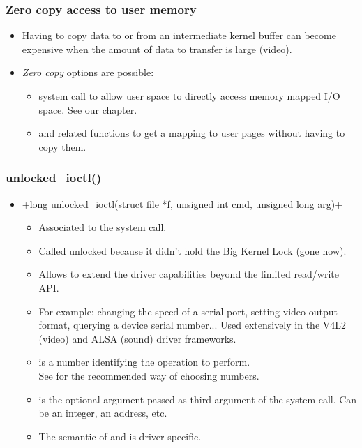 \begin{frame}
  \frametitle{Zero copy access to user memory}
  \begin{itemize}
  \item Having to copy data to or from an intermediate kernel buffer
    can become expensive when the amount of data to transfer is
    large (video).
  \item \emph{Zero copy} options are possible:
    \begin{itemize}
    \item {} system call to allow user space to directly
      access memory mapped I/O space. See our  chapter.
    \item {} and related functions to get a
      mapping to user pages without having to copy them.
    \end{itemize}
  \end{itemize}
\end{frame}

\begin{frame}[fragile]
  \frametitle{unlocked\_ioctl()}
  \begin{itemize}
  \item {}+long unlocked_ioctl(struct file *f, unsigned int cmd, unsigned long arg)+
    \begin{itemize}
    \item Associated to the  system call.
    \item Called unlocked because it didn't hold the Big Kernel Lock
      (gone now).
    \item Allows to extend the driver capabilities beyond the limited
      read/write API.
    \item For example: changing the speed of a serial port, setting
      video output format, querying a device serial number... Used
      extensively in the V4L2 (video) and ALSA (sound) driver frameworks.
    \item {} is a number identifying the operation to perform.\\
      See  for the recommended way of choosing
       numbers.
    \item {} is the optional argument passed as third argument
      of the  system call. Can be an integer, an
      address, etc.
    \item The semantic of  and  is
      driver-specific.
    \end{itemize}
  \end{itemize}
\end{frame}

